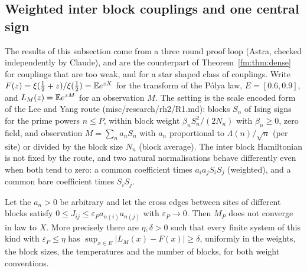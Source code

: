 \subsection{Weighted inter block couplings and one central sign}\label{fm:sec:weakstar}

The results of this subsection come from a three round proof loop (Astra, checked independently by Claude), and are the counterpart of Theorem~\ref{fm:thm:dense} for couplings that are too weak, and for a star shaped class of couplings. Write $F(z)=\xi(\frac12+z)/\xi(\frac12)=\mathbb{E} e^{zX}$ for the transform of the P\'olya law, $E=[0.6,0.9]$, and $L_M(z)=\mathbb{E} e^{zM}$ for an observation $M$. The setting is the scale encoded form of the Lee and Yang route (misc/research/rh2/R1.md): blocks $S_n$ of Ising signs for the prime powers $n\le P$, within block weight $\beta_nS_n^2/(2N_n)$ with $\beta_n\ge0$, zero field, and observation $M=\sum_na_nS_n$ with $a_n$ proportional to $\Lambda(n)/\sqrt n$ (per site) or divided by the block size $N_n$ (block average). The inter block Hamiltonian is not fixed by the route, and two natural normalisations behave differently even when both tend to zero: a common coefficient times $a_ia_jS_iS_j$ (weighted), and a common bare coefficient times $S_iS_j$.

\begin{theorem}\label{fm:thm:weighted}
Let the $a_n>0$ be arbitrary and let the cross edges between sites of different blocks satisfy $0\le J_{ij}\le\varepsilon_Pa_{n(i)}a_{n(j)}$ with $\varepsilon_P\to0$. Then $M_P$ does not converge in law to $X$. More precisely there are $\eta,\delta>0$ such that every finite system of this kind with $\varepsilon_P\le\eta$ has $\sup_{x\in E}|L_M(x)-F(x)|\ge\delta$, uniformly in the weights, the block sizes, the temperatures and the number of blocks, for both weight conventions.
\end{theorem}


